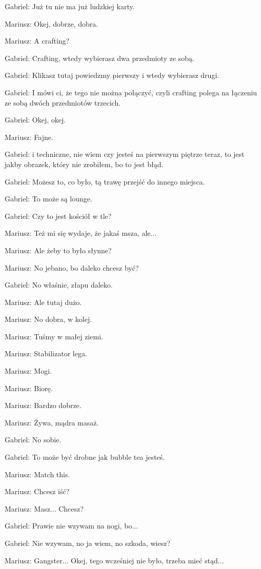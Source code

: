 Gabriel: Już tu nie ma już ludzkiej karty.

Mariusz: Okej, dobrze, dobra.

Mariusz: A crafting?

Gabriel: Crafting, wtedy wybierasz dwa przedmioty ze sobą.

Gabriel: Klikasz tutaj powiedzmy pierwszy i wtedy wybierasz drugi.

Gabriel: I mówi ci, że tego nie można połączyć, czyli crafting polega na łączeniu ze sobą dwóch przedmiotów trzecich.

Gabriel: Okej, okej.

Mariusz: Fajne.

Gabriel: i techniczne, nie wiem czy jesteś na pierwszym piętrze teraz, to jest jakby obrazek, który nie zrobiłem, bo to jest błąd.

Gabriel: Możesz to, co było, tą trawę przejść do innego miejsca.

Gabriel: To może są lounge.

Gabriel: Czy to jest kościół w tle?

Mariusz: Też mi się wydaje, że jakaś msza, ale...

Mariusz: Ale żeby to było słynne?

Mariusz: No jebano, bo daleko chcesz być?

Gabriel: No właśnie, złapu daleko.

Mariusz: Ale tutaj dużo.

Mariusz: No dobra, w kolej.

Mariusz: Tuśmy w małej ziemi.

Mariusz: Stabilizator lega.

Mariusz: Mogi.

Mariusz: Biorę.

Mariusz: Bardzo dobrze.

Mariusz: Żywa, mądra masaż.

Gabriel: No sobie.

Gabriel: To może być drobne jak bubble tea jesteś.

Mariusz: Match this.

Mariusz: Chcesz iść?

Mariusz: Masz... Chcesz?

Gabriel: Prawie nie wzywam na nogi, bo...

Gabriel: Nie wzywam, no ja wiem, no szkoda, wiesz?

Mariusz: Gangster... Okej, tego wcześniej nie było, trzeba mieć stąd...

